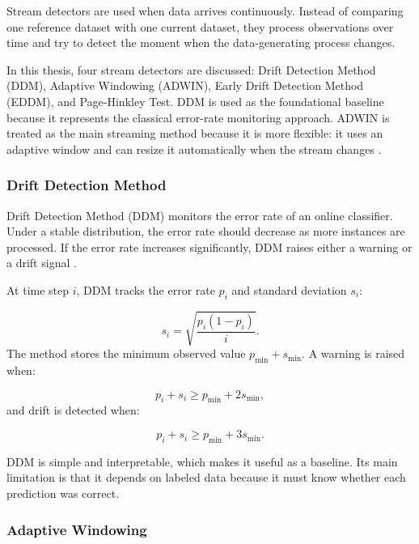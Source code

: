 Stream detectors are used when data arrives continuously. Instead of comparing one reference dataset with one current dataset, they process observations over time and try to detect the moment when the data-generating process changes.

In this thesis, four stream detectors are discussed: Drift Detection Method (DDM), Adaptive Windowing (ADWIN), Early Drift Detection Method (EDDM), and Page-Hinkley Test. DDM is used as the foundational baseline because it represents the classical error-rate monitoring approach. ADWIN is treated as the main streaming method because it is more flexible: it uses an adaptive window and can resize it automatically when the stream changes \cite{RiverDDM,RiverADWIN,ComparativeConceptDriftDetectors}.

\subsubsection{Drift Detection Method}

Drift Detection Method (DDM) monitors the error rate of an online classifier. Under a stable distribution, the error rate should decrease as more instances are processed. If the error rate increases significantly, DDM raises either a warning or a drift signal \cite{RiverDDM}.

At time step $i$, DDM tracks the error rate $p_i$ and standard deviation $s_i$:

\begin{equation}
s_i = \sqrt{\frac{p_i(1-p_i)}{i}}.
\end{equation}
The method stores the minimum observed value $p_{\min} + s_{\min}$. A warning is raised when:

\begin{equation}
p_i + s_i \geq p_{\min} + 2s_{\min},
\end{equation}
and drift is detected when:

\begin{equation}
p_i + s_i \geq p_{\min} + 3s_{\min}.
\end{equation}

DDM is simple and interpretable, which makes it useful as a baseline. Its main limitation is that it depends on labeled data because it must know whether each prediction was correct.

\subsubsection{Adaptive Windowing}

